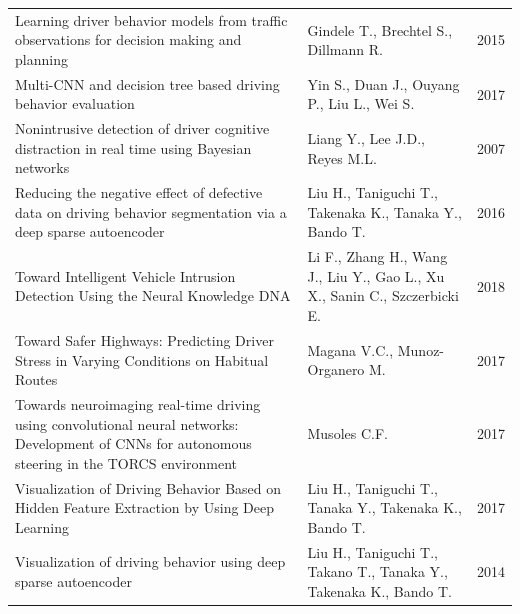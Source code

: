 \documentclass[10pt,journal,compsoc]{IEEEtran}
\begin{document}
\begin{table}[!t]
\begin{tabular}{p{10cm}p{7cm}l}
Learning driver behavior models from traffic observations for decision making and planning                                                       & Gindele T., Brechtel S., Dillmann R.                                         & 2015                             \\
Multi-CNN and decision tree based driving behavior evaluation                                                                                    & Yin S., Duan J., Ouyang P., Liu L., Wei S.                                   & 2017                             \\
Nonintrusive detection of driver cognitive distraction in real time using Bayesian networks                                                      & Liang Y., Lee J.D., Reyes M.L.                                               & 2007                             \\
Reducing the negative effect of defective data on driving behavior segmentation via a deep sparse autoencoder                                    & Liu H., Taniguchi T., Takenaka K., Tanaka Y., Bando T.                       & 2016                             \\
Toward Intelligent Vehicle Intrusion Detection Using the Neural Knowledge DNA                                                                    & Li F., Zhang H., Wang J., Liu Y., Gao L., Xu X., Sanin C., Szczerbicki E.    & 2018                             \\
Toward Safer Highways: Predicting Driver Stress in Varying Conditions on Habitual Routes                                                         & Magana V.C., Munoz-Organero M.                                               & 2017                             \\
Towards neuroimaging real-time driving using convolutional neural networks: Development of CNNs for autonomous steering in the TORCS environment & Musoles C.F.                                                                 & 2017                             \\
Visualization of Driving Behavior Based on Hidden Feature Extraction by Using Deep Learning                                                      & Liu H., Taniguchi T., Tanaka Y., Takenaka K., Bando T.                       & 2017                             \\
Visualization of driving behavior using deep sparse autoencoder                                                                                  & Liu H., Taniguchi T., Takano T., Tanaka Y., Takenaka K., Bando T.            & 2014                            
\end{tabular}
\end{table}
\end{document}
